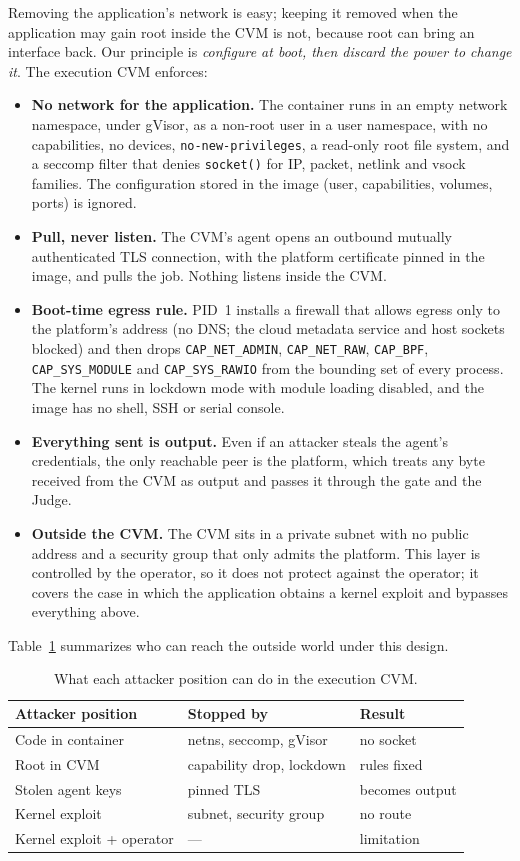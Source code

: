 Removing the application's network is easy; keeping it removed when the application may gain
root inside the CVM is not, because root can bring an interface back. Our principle is
\emph{configure at boot, then discard the power to change it}. The execution CVM enforces:
\begin{itemize}
  \item \textbf{No network for the application.} The container runs in an empty network
  namespace, under gVisor, as a non-root user in a user namespace, with no capabilities, no
  devices, \texttt{no-new-privileges}, a read-only root file system, and a seccomp filter that
  denies \texttt{socket()} for IP, packet, netlink and vsock families. The configuration stored
  in the image (user, capabilities, volumes, ports) is ignored.
  \item \textbf{Pull, never listen.} The CVM's agent opens an outbound mutually authenticated TLS
  connection, with the platform certificate pinned in the image, and pulls the job. Nothing
  listens inside the CVM.
  \item \textbf{Boot-time egress rule.} PID~1 installs a firewall that allows egress only to the
  platform's address (no DNS; the cloud metadata service and host sockets blocked) and then
  drops \texttt{CAP\_NET\_ADMIN}, \texttt{CAP\_NET\_RAW}, \texttt{CAP\_BPF},
  \texttt{CAP\_SYS\_MODULE} and \texttt{CAP\_SYS\_RAWIO} from the bounding set of every process.
  The kernel runs in lockdown mode with module loading disabled, and the image has no shell, SSH
  or serial console.
  \item \textbf{Everything sent is output.} Even if an attacker steals the agent's credentials,
  the only reachable peer is the platform, which treats any byte received from the CVM as output
  and passes it through the gate and the Judge.
  \item \textbf{Outside the CVM.} The CVM sits in a private subnet with no public address and a
  security group that only admits the platform. This layer is controlled by the operator, so it
  does not protect against the operator; it covers the case in which the application obtains a
  kernel exploit and bypasses everything above.
\end{itemize}
Table~\ref{tab:who} summarizes who can reach the outside world under this design.

\begin{table}[t]
\centering
\caption{What each attacker position can do in the execution CVM.}
\label{tab:who}
\footnotesize
\begin{tabular}{@{}lll@{}}
\toprule
Attacker position & Stopped by & Result \\
\midrule
Code in container & netns, seccomp, gVisor & no socket \\
Root in CVM & capability drop, lockdown & rules fixed \\
Stolen agent keys & pinned TLS & becomes output \\
Kernel exploit & subnet, security group & no route \\
Kernel exploit + operator & --- & limitation \\
\bottomrule
\end{tabular}
\end{table}

